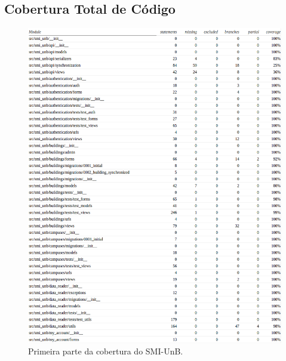 \begin{apendicesenv}
\chapter{Cobertura Total de Código}
\begin{figure}[!htpb]
    \centering
    \includegraphics[keepaspectratio=true,scale=0.45]{figuras/cobertura01.eps}
    \caption{Primeira parte da cobertura do SMI-UnB.}
    \label{cobertura01}
\end{figure}


\end{apendicesenv}
